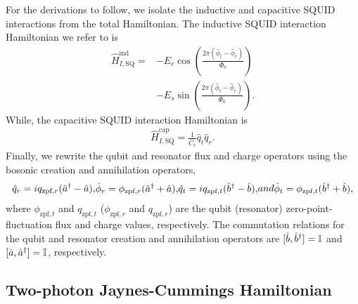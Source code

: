 For the derivations to follow, we isolate the inductive and capacitive SQUID interactions from the total Hamiltonian. The inductive SQUID interaction Hamiltonian we refer to is
\begin{align}
    \hat{H}_{I,\text{SQ}}^{\text{ind}}=&- E_{c}\cos(\frac{2\pi ( \hat{\phi}_t-\hat{\phi}_r)}{\Phi_0})\nonumber\\  &-E_{s}\sin(\frac{2\pi ( \hat{\phi}_t-\hat{\phi}_r)}{\Phi_0}).
\end{align}
While, the capacitive SQUID interaction Hamiltonian is
\begin{align}
    \hat{H}_{I,\text{SQ}}^{\text{cap}}=\frac{1}{\overline{C}_c}\hat{q}_t \hat{q}_r.
\end{align}
Finally, we rewrite the qubit and resonator flux and charge operators using the bosonic creation and annihilation operators,
\begin{subequations}
\begin{align}
    \hat{q}_{r}=iq_{\text{zpf},r}(\adag -\aop),
\end{align}
\begin{align}
    \hat{\phi}_{r}=\phi_{\text{zpf},r}(\adag +\aop),
\end{align}
\begin{align}
    \hat{q}_{t}=iq_{\text{zpf},t}(\bdag -\bop),
\end{align}
and
\begin{align}
    \hat{\phi}_{t}=\phi_{\text{zpf},t}(\bdag +\bop),
\end{align}
\end{subequations}
where $\phi_{\text{zpf},t}$ and $q_{\text{zpf},t}$ ($\phi_{\text{zpf},r}$ and $q_{\text{zpf},r}$) are the qubit (resonator) zero-point-fluctuation flux and charge values, respectively. The commutation relations for the qubit and resonator creation and annihilation operators are $[\hat{b},\hat{b}^\dagger]=\mathbb{I}$ and $[\hat{a},\hat{a}^\dagger]=\mathbb{I}$, respectively.
\\


\subsection{Two-photon Jaynes-Cummings Hamiltonian}


